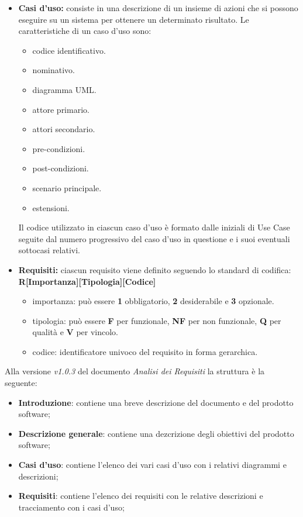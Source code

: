     \begin{itemize}
        \item \textbf{Casi d'uso:} consiste in una descrizione di un insieme di azioni che si possono eseguire su un sistema per ottenere un determinato risultato.
        Le caratteristiche di un caso d'uso sono:
        \begin{itemize}
            \item {codice identificativo.}
            \item {nominativo.}
            \item {diagramma UML.}
            \item {attore primario.}
            \item {attori secondario.}
            \item {pre-condizioni.}
            \item {post-condizioni.}
            \item {scenario principale.}
            \item {estensioni.}
        \end{itemize}
        Il codice utilizzato in ciascun caso d'uso è formato dalle iniziali di Use Case seguite dal numero progressivo del caso d'uso in questione e i suoi eventuali sottocasi relativi.
        \item \textbf{Requisiti:} ciascun requisito viene definito seguendo lo standard di codifica:\\
        \textbf{R[Importanza][Tipologia][Codice]}
        \begin {itemize}
            \item{importanza:} può essere \textbf{1} obbligatorio, \textbf{2} desiderabile e \textbf{3} opzionale.
            \item {tipologia:} può essere \textbf{F} per funzionale, \textbf{NF} per non funzionale, \textbf{Q} per qualità e \textbf{V} per vincolo.
            \item {codice:} identificatore univoco del requisito in forma gerarchica.
        \end {itemize}
    \end{itemize}

    Alla versione \textit{v1.0.3} del documento \textit{Analisi dei Requisiti} la struttura è la seguente:
    \begin{itemize}
        \item \textbf{Introduzione}: contiene una breve descrizione del documento e del prodotto software;
        \item \textbf{Descrizione generale}: contiene una dezcrizione degli obiettivi del prodotto software;
        \item \textbf{Casi d'uso}: contiene l'elenco dei vari casi d'uso con i relativi diagrammi e descrizioni;
        \item \textbf{Requisiti}: contiene l'elenco dei requisiti con le relative descrizioni e tracciamento con i casi d'uso;
    \end{itemize}

